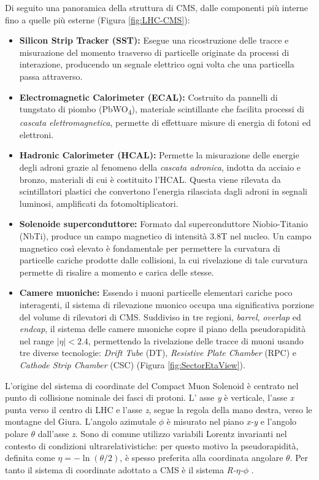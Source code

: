 Di seguito una panoramica della struttura di CMS, dalle componenti più interne fino a quelle più esterne \cite{MasterThesisNicLai}(Figura \ref{fig:LHC-CMS}):

\begin{itemize}
  \item \textbf{Silicon Strip Tracker (SST):} Esegue una ricostruzione delle tracce e misurazione del momento trasverso di particelle originate da processi di interazione, producendo un segnale elettrico ogni volta che una particella passa attraverso.
  \item \textbf{Electromagnetic Calorimeter (ECAL):} Costruito da pannelli di tungstato di piombo (\si{PbWO_4}), materiale scintillante che facilita processi di \textit{cascata elettromagnetica}, permette di effettuare misure di energia di fotoni ed elettroni.
  \item \textbf{Hadronic Calorimeter (HCAL):} Permette la misurazione delle energie degli adroni grazie al fenomeno della \textit{cascata adronica}, indotta da acciaio e bronzo, materiali di cui è costituito l'HCAL. Questa viene rilevata da scintillatori plastici che convertono l'energia rilasciata dagli adroni in segnali luminosi, amplificati da fotomoltiplicatori.
  \item \textbf{Solenoide superconduttore:} Formato dal superconduttore Niobio-Titanio (NbTi), produce un campo magnetico di intensità 3.8T nel nucleo. Un campo magnetico così elevato è fondamentale per permettere la curvatura di particelle cariche prodotte dalle collisioni, la cui rivelazione di tale curvatura permette di risalire a momento e carica delle stesse.
  \item \textbf{Camere muoniche:} Essendo i muoni particelle elementari cariche poco interagenti, il sistema di rilevazione muonico occupa una significativa porzione del volume di rilevatori di CMS. Suddiviso in tre regioni, \textit{barrel}, \textit{overlap} ed \textit{endcap}, il sistema delle camere muoniche copre il piano della pseudorapidità nel range $|\eta| < 2.4$, permettendo la rivelazione delle tracce di muoni usando tre diverse tecnologie: \textit{Drift Tube} (DT), \textit{Resistive Plate Chamber} (RPC) e \textit{Cathode Strip Chamber} (CSC) \cite{TheMuonProject} (Figura \ref{fig:SectorEtaView}).
\end{itemize}

L'origine del sistema di coordinate del Compact Muon Solenoid è centrato nel punto di collisione nominale dei fasci di protoni. L' asse \textit{y} è verticale, l'asse \textit{x} punta verso il centro di LHC e l'asse \textit{z}, segue la regola della mano destra, verso le montagne del Giura. L'angolo azimutale $\phi$ è misurato nel piano \textit{x-y} e l'angolo polare $\theta$ dall'asse \textit{z}. Sono di comune utilizzo variabili Lorentz invarianti nel contesto di condizioni ultrarelativistiche: per questo motivo la pseudorapidità, definita come $\eta = -\ln\left(\theta/2\right)$, è spesso preferita alla coordinata angolare $\theta$. Per tanto il sistema di coordinate adottato a CMS è il sistema \textit{R-$\eta$-$\phi$} \cite{Quertenmont:2010ota}.



